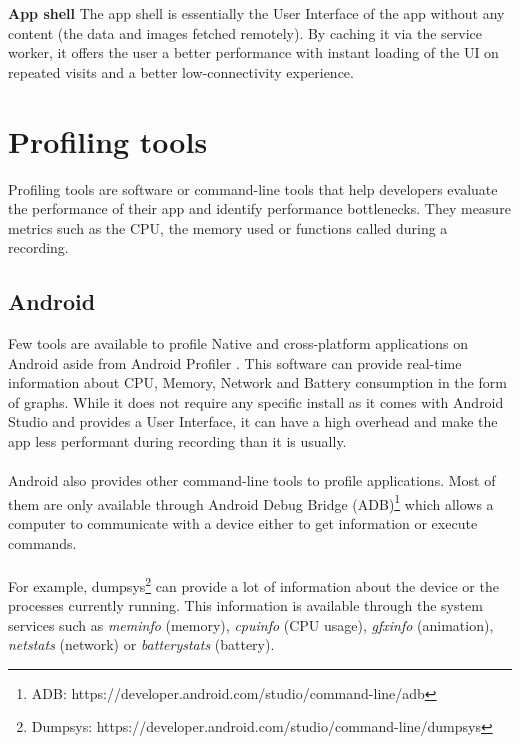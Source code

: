 \documentclass{kththesis}
\begin{document}
\medskip
\textbf{App shell} \newline
The app shell is essentially the User Interface of the app without any content \cite{AppShell_def} (the data and images fetched remotely). By caching it via the service worker, it offers the user a better performance with instant loading of the UI on repeated visits and a better low-connectivity experience.


\section{Profiling tools}

Profiling tools are software or command-line tools that help developers evaluate the performance of their app and identify performance bottlenecks. They measure metrics such as the CPU, the memory used or functions called during a recording.

\subsection{Android}

Few tools are available to profile Native and cross-platform applications on Android aside from Android Profiler \cite{nanoscope}. This software can provide real-time information about CPU, Memory, Network and Battery consumption in the form of graphs. While it does not require any specific install as it comes with Android Studio and provides a User Interface, it can have a high overhead \cite{nanoscope} and make the app less performant during recording than it is usually. 

\paragraph{}
Android also provides other command-line tools to profile applications. Most of them are only available through Android Debug Bridge (ADB)\footnote{ADB: https://developer.android.com/studio/command-line/adb} which allows a computer to communicate with a device either to get information or execute commands. 

\paragraph{}
For example, dumpsys\footnote{Dumpsys: https://developer.android.com/studio/command-line/dumpsys} can provide a lot of information about the device or the processes currently running. This information is available through the system services such as \textit{meminfo} (memory), \textit{cpuinfo} (CPU usage), \textit{gfxinfo} (animation), \textit{netstats} (network) or \textit{batterystats} (battery).
\end{document}

